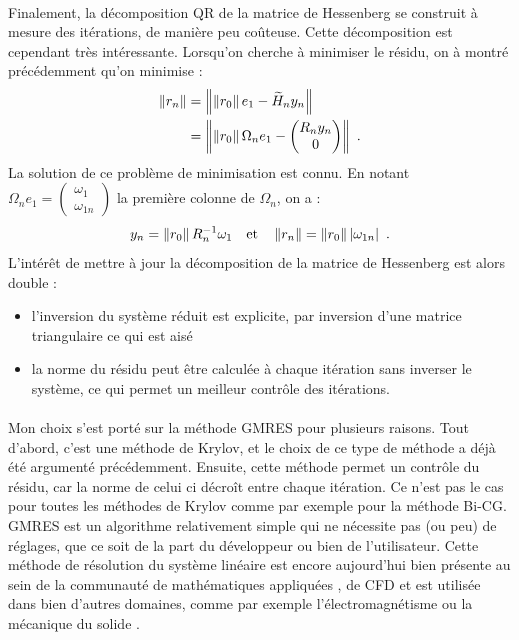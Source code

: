 	\paragraph{}
	Finalement, la décomposition QR de la matrice de Hessenberg se construit à mesure des itérations, de manière peu coûteuse.
	Cette décomposition est cependant très intéressante.
	Lorsqu'on cherche à minimiser le résidu, on à montré précédemment qu'on minimise :
	\begin{align*}
		\norm{r_n} &= \norm{\norm{r_0} e_1 - \widetilde{H}_ny_n} \\
		&= \norm{\norm{r_0} \Omega_ne_1 - \begin{pmatrix}R_ny_n \\ 0\end{pmatrix}}\ .
	\end{align*}
	La solution de ce problème de minimisation est connu.
	En notant $\Omega_ne_1 = \begin{pmatrix}\omega_1 \\ \omega_{1n}\end{pmatrix}$ la première colonne de $\Omega_n$, on a :
	\[y_n = \norm{r_0}R_n^{-1}\omega_1\quad\textrm{et}\quad\norm{r_n} = \norm{r_0}\left|\omega_{1n}\right|\ .\]
	L'intérêt de mettre à jour la décomposition de la matrice de Hessenberg est alors double :
	\begin{itemize}
		\item l'inversion du système réduit est explicite, par inversion d'une matrice triangulaire ce qui est aisé
		\item la norme du résidu peut être calculée à chaque itération sans inverser le système, ce qui permet un meilleur contrôle des itérations.
	\end{itemize}

	\paragraph{}
	Mon choix s'est porté sur la méthode GMRES pour plusieurs raisons.
	Tout d'abord, c'est une méthode de Krylov, et le choix de ce type de méthode a déjà été argumenté précédemment.
	Ensuite, cette méthode permet un contrôle du résidu, car la norme de celui ci décroît entre chaque itération.
	Ce n'est pas le cas pour toutes les méthodes de Krylov comme par exemple pour la méthode Bi-CG.
	GMRES est un algorithme relativement simple qui ne nécessite pas (ou peu) de réglages, que ce soit de la part du développeur ou bien de l'utilisateur.
	Cette méthode de résolution du système linéaire est encore aujourd'hui bien présente au sein de la communauté de mathématiques appliquées \cite{Vasseur2016}, de CFD \cite{FrancoCamierAndrejEtAl2020} et est utilisée dans bien d'autres domaines, comme par exemple l'électromagnétisme \cite{ErnstGander2012} ou la mécanique du solide \cite{Mercier2015}.
